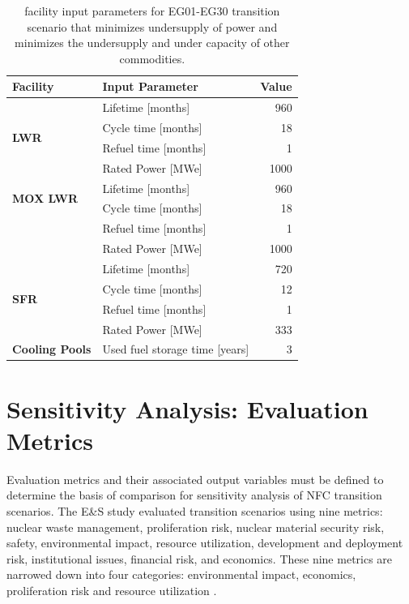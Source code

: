 \begin{table}[]
    \centering
    \doublespacing
    \caption{\Cyclus facility input parameters for
	EG01-EG30 transition scenario
	that minimizes undersupply of power and minimizes 
	the undersupply and under capacity of other commodities. }
	\label{tab:facinputs}
    \small
    \begin{tabular}{llr}
        \hline
        \textbf{Facility}                 & \textbf{Input Parameter}                    & \textbf{Value} \\ \hline
        \multirow{4}{*}{\textbf{LWR}}     & Lifetime {[}months{]}              & 960   \\
                                 & Cycle time {[}months{]}            & 18    \\
                                 & Refuel time {[}months{]}           & 1     \\
                                 & Rated Power {[}MWe{]}              & 1000  \\ \hline
        \multirow{2}{*}{\textbf{MOX LWR}} & Lifetime {[}months{]}              & 960   \\
                                 & Cycle time {[}months{]}            & 18    \\
                                 & Refuel time {[}months{]}           & 1     \\
                                 & Rated Power {[}MWe{]}              & 1000  \\ \hline
        \multirow{4}{*}{\textbf{SFR}}     & Lifetime {[}months{]}              & 720   \\
                                 & Cycle time {[}months{]}            & 12    \\
                                 & Refuel time {[}months{]}           & 1     \\
                                 & Rated Power {[}MWe{]}              & 333   \\ \hline
        \textbf{Cooling Pools}            & Used fuel storage time {[}years{]} & 3  \\ \hline
        \end{tabular}
    \end{table}

\section{Sensitivity Analysis: Evaluation Metrics}
Evaluation metrics and their associated output variables 
must be defined to determine the basis of comparison for sensitivity 
analysis of \gls{NFC} transition scenarios.
The E\&S study \cite{wigeland_nuclear_2014} evaluated transition 
scenarios using nine metrics: nuclear waste 
management, proliferation risk, nuclear material security risk, 
safety, environmental impact, resource utilization, development 
and deployment risk, institutional issues, financial risk, and 
economics. 
These nine metrics are narrowed down into four categories: environmental 
impact, economics, proliferation risk and resource utilization
\cite{passerini_systematic_2014}. 

